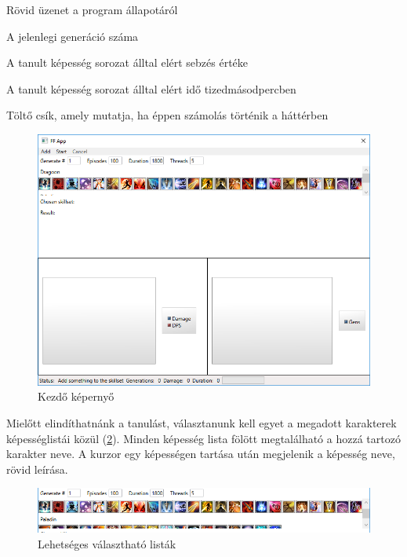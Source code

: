 \documentclass[12pt]{article}
\begin{document}
\begin{description}[align=right,labelwidth=3cm]
	\item [Status] Rövid üzenet a program állapotáról
	\item [Generations] A jelenlegi generáció száma
	\item [Damage] A tanult képesség sorozat álltal elért sebzés értéke
	\item [Duration] A tanult képesség sorozat álltal elért idő tizedmásodpercben
	\item [Bar] Töltő csík, amely mutatja, ha éppen számolás történik a háttérben
\end{description}

\begin{figure}[H]
	\begin{center}
		\includegraphics[width=1\textwidth]{start}
	\end{center}
	\caption{Kezdő képernyő}
	\label{fig:start}
\end{figure}

Mielőtt elindíthatnánk a tanulást, választanunk kell egyet a megadott karakterek képességlistái közül (\ref{fig:skilllist}). Minden képesség lista fölött megtalálható a hozzá tartozó karakter neve. A kurzor egy képességen tartása után megjelenik a képesség neve, rövid leírása. 

\begin{figure}[H]
	\begin{center}
		\includegraphics[width=1\textwidth]{skilllist}
	\end{center}
	\caption{Lehetséges választható listák}
	\label{fig:skilllist}
\end{figure}
\end{document}
